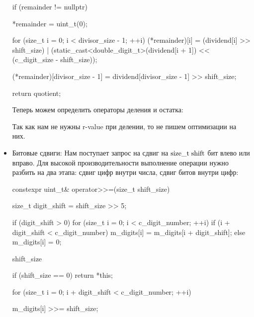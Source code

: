\begin{itemize}
\begin{cppcode}
{    if (remainder != nullptr) {
        *remainder = uint_t(0);

        for (size_t i = 0; i < divisor_size - 1; ++i) {
            (*remainder)[i] =
                (dividend[i] >> shift_size)
                | (static_cast<double_digit_t>(dividend[i + 1]) << (c_digit_size - shift_size));
        }

        (*remainder)[divisor_size - 1] = dividend[divisor_size - 1] >> shift_size;
    }

    return quotient;
}
   \end{cppcode}
   Теперь можем определить операторы деления и остатка:
   Так как нам не нужны r-value при делении, то не пишем оптимизации на них.
  \item Битовые сдвиги:
  Нам поступает запрос на сдвиг на $\rm size\_t \hspace{0.1cm} shift$ бит влево или вправо. Для высокой производительности выполнение операции нужно разбить на два этапа: сдвиг цифр внутри числа, сдвиг битов внутри цифр:
  \begin{cppcode}
constexpr uint_t& operator>>=(size_t shift_size) {
    size_t digit_shift = shift_size >> 5;

    if (digit_shift > 0) {
        for (size_t i = 0; i < c_digit_number; ++i) {
            if (i + digit_shift < c_digit_number) {
                m_digits[i] = m_digits[i + digit_shift];
            } else {
                m_digits[i] = 0;
            }
        }
    }

    shift_size %

    if (shift_size == 0) {
        return *this;
    }

    for (size_t i = 0; i + digit_shift < c_digit_number; ++i) {
        m_digits[i] >>= shift_size;

}}
\end{cppcode}
\end{itemize}
